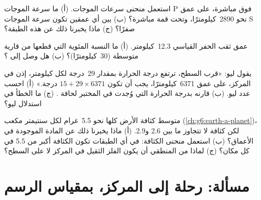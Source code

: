 \begin{exercise}[$\star\star$]\label{exo:g6:inside-the-earth:9}
استعمل منحنى سرعات الموجات. (أ) ما سرعة الموجات P فوق
 مباشرة، على عمق نحو 2890~كيلومترًا، وتحت قمة  مباشرة؟
(ب) بين أي عمقين تكون سرعة الموجات S صفرًا؟ (ج) ماذا
يخبرنا ذلك عن هذه الطبقة؟
\end{exercise}

\begin{exercise}[$\star\star$]\label{exo:g6:inside-the-earth:10}
عمق ثقب الحفر القياسي 12.3~كيلومتر. (أ) ما النسبة المئوية التي قطعها من 
قارية متوسطة (30~كيلومترًا)؟ (ب) هل وصل إلى ؟
\end{exercise}

\begin{exercise}[$\star\star\star$]\label{exo:g6:inside-the-earth:11}
يقول ليو: «قرب السطح، ترتفع درجة الحرارة بمقدار 29~درجة لكل
كيلومتر، إذن في المركز، على عمق 6371~كيلومترًا، يجب أن تكون
$15 + 29 \times 6371$ درجة.» (أ) احسب عدد ليو. (ب) قارنه
بدرجة الحرارة التي وُجدت في المختبر لحافة . (ج) ما الخطأ في استدلال ليو؟
\end{exercise}

\begin{exercise}[$\star\star\star$]\label{exo:g6:inside-the-earth:12}
متوسط كثافة الأرض كلها نحو 5.5~غرام لكل سنتيمتر
مكعب (\cref{ch:g6:earth-a-planet})، لكن كثافة  
لا تتجاوز ما بين 2.6 و2.9. (أ) ماذا يخبرنا ذلك عن المادة الموجودة
في الأعماق؟ (ب) استعمل منحنى الكثافة: في أي الطبقات تكون الكثافة أكبر من 5.5 في كل مكان؟ (ج) لماذا من المنطقي أن يكون الفلز الثقيل في
المركز لا على السطح؟
\end{exercise}

\section{مسألة: رحلة إلى المركز، بمقياس الرسم}

